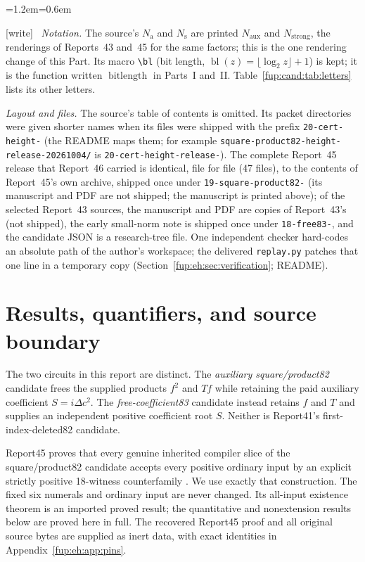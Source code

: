 \documentclass[11pt,letterpaper]{article}
\theoremstyle{definition}\newtheorem{definition}[theorem]{Definition}
\theoremstyle{remark}\newtheorem{remark}[theorem]{Remark}
\newcommand{\bits}{\operatorname{bitlength}}
\newcommand{\D}{\Delta}
\newcommand{\Na}{N_{\mathrm{aux}}}\newcommand{\Nk}{N_{\mathrm{index}}}\newcommand{\Nt}{N_{\mathrm{transport}}}
\newcommand{\Ns}{N_{\mathrm{strong}}}
\newcommand{\bl}{\operatorname{bl}}
\newcommand{\wtag}{\textup{[write]}}
\newenvironment{writenote}{\par\smallskip\begin{list}{}{\leftmargin=1.2em\rightmargin=0.6em}\item[]\small\wtag\ }{\end{list}\smallskip}
\newcommand{\rw}[1]{\nolinkurl{#1}}%
\begin{document}
\begin{writenote}
\emph{Notation.} The source's $N_{\mathrm a}$ and $N_{\mathrm s}$ are printed $\Na$ and $\Ns$, the renderings of Reports~43 and~45 for the same factors; this is the one rendering change of this Part. Its macro \verb|\bl| (bit length, $\bl(z)=\lfloor\log_2z\rfloor+1$) is kept; it is the function written $\bits$ in Parts~I and~II. Table~\ref{fup:cand:tab:letters} lists its other letters.

\emph{Layout and files.} The source's table of contents is omitted. Its packet directories were given shorter names when its files were shipped with the prefix \texttt{20-cert-height-} (the README maps them; for example \rw{square-product82-height-release-20261004/} is \rw{20-cert-height-release-}). The complete Report~45 release that Report~46 carried is identical, file for file (47 files), to the contents of Report~45's own archive, shipped once under \texttt{19-square-product82-} (its manuscript and PDF are not shipped; the manuscript is printed above); of the selected Report~43 sources, the manuscript and PDF are copies of Report~43's (not shipped), the early small-norm note is shipped once under \texttt{18-free83-}, and the candidate JSON is a research-tree file. One independent checker hard-codes an absolute path of the author's workspace; the delivered \rw{replay.py} patches that one line in a temporary copy (Section~\ref{fup:eh:sec:verification}; README).
\end{writenote}

\section{Results, quantifiers, and source boundary}
\label{fup:eh:sec:scope}
The two circuits in this report are distinct. The
\emph{auxiliary square/product82} candidate frees the supplied products
$f^2$ and $Tf$ while retaining the paid auxiliary coefficient
$S=i\D c^2$. The \emph{free-coefficient83} candidate instead retains
$f$ and $T$ and supplies an independent positive coefficient root $S$.
Neither is Report41's first-index-deleted82 candidate.

Report45 proves that every genuine inherited compiler slice of the
square/product82 candidate accepts every positive ordinary input by an
explicit strictly positive 18-witness counterfamily \cite{fup:eh:report45}.
We use exactly that construction. The fixed six numerals and ordinary
input are never changed. Its all-input existence theorem is an imported
proved result; the quantitative and nonextension results below are proved
here in full. The recovered Report45 proof and all original source bytes
are supplied as inert data, with exact identities in Appendix~\ref{fup:eh:app:pins}.
\end{document}
